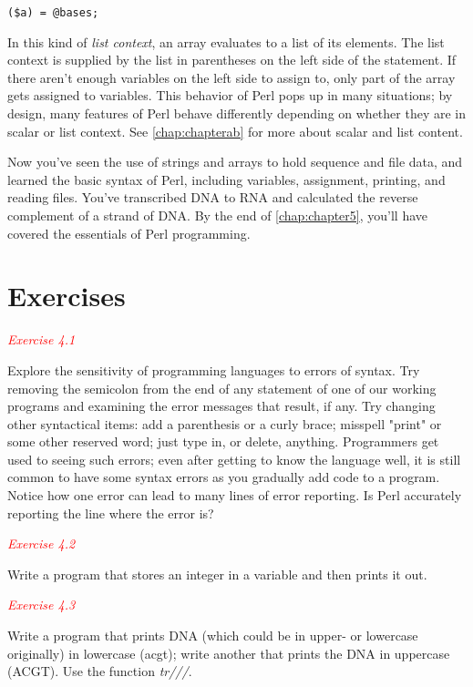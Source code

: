 \begin{lstlisting}
($a) = @bases;
\end{lstlisting}

In this kind of \textit{list context}, an array evaluates to a list of its elements. The list context is supplied by the list in parentheses on the left side of the statement. If there aren't enough variables on the left side to assign to, only part of the array gets assigned to variables. This behavior of Perl pops up in many situations; by design, many features of Perl behave differently depending on whether they are in scalar or list context. See \autoref{chap:chapterab} for more about scalar and list content.

Now you've seen the use of strings and arrays to hold sequence and file data, and learned the basic syntax of Perl, including variables, assignment, printing, and reading files. You've transcribed DNA to RNA and calculated the reverse complement of a strand of DNA. By the end of \autoref{chap:chapter5}, you'll have covered the essentials of Perl programming. 

\section{Exercises}
\textcolor{red}{\textit{Exercise 4.1}}
\begin{adjustwidth}{2em}{}
Explore the sensitivity of programming languages to errors of syntax. Try removing the semicolon from the end of any statement of one of our working programs and examining the error messages that result, if any.  Try changing other syntactical items: add a parenthesis or a curly brace; misspell "print" or some other reserved word; just type in, or delete, anything. Programmers get used to seeing such errors; even after getting to know the language well, it is still common to have some syntax errors as you gradually add code to a program. Notice how one error can lead to many lines of error reporting. Is Perl accurately reporting the line where the error is? 
\end{adjustwidth}

\textcolor{red}{\textit{Exercise 4.2}}
\begin{adjustwidth}{2em}{}
Write a program that stores an integer in a variable and then prints it out. 
\end{adjustwidth}

\textcolor{red}{\textit{Exercise 4.3}}
\begin{adjustwidth}{2em}{}
Write a program that prints DNA (which could be in upper- or lowercase originally) in lowercase (acgt); write another that prints the DNA in uppercase (ACGT). Use the function \textit{tr///}. 
\end{adjustwidth}

